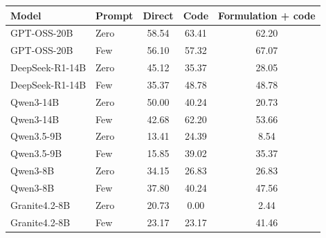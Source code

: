 \begin{tabular}{llccc}
\toprule
Model & Prompt & Direct & Code & Formulation + code \\
\midrule
GPT-OSS-20B & Zero & 58.54 & 63.41 & 62.20 \\
GPT-OSS-20B & Few & 56.10 & 57.32 & 67.07 \\
DeepSeek-R1-14B & Zero & 45.12 & 35.37 & 28.05 \\
DeepSeek-R1-14B & Few & 35.37 & 48.78 & 48.78 \\
Qwen3-14B & Zero & 50.00 & 40.24 & 20.73 \\
Qwen3-14B & Few & 42.68 & 62.20 & 53.66 \\
Qwen3.5-9B & Zero & 13.41 & 24.39 & 8.54 \\
Qwen3.5-9B & Few & 15.85 & 39.02 & 35.37 \\
Qwen3-8B & Zero & 34.15 & 26.83 & 26.83 \\
Qwen3-8B & Few & 37.80 & 40.24 & 47.56 \\
Granite4.2-8B & Zero & 20.73 & 0.00 & 2.44 \\
Granite4.2-8B & Few & 23.17 & 23.17 & 41.46 \\
\bottomrule
\end{tabular}
